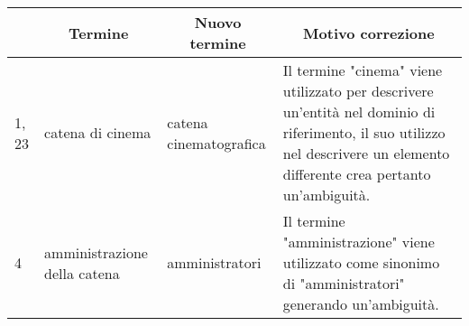 \begin{tabularx}{\linewidth}{|p{1.5cm}|p{3cm}|p{3cm}|X|}
      \hline
      \rowcolor{tblhdrcolor}
      \multicolumn{1}{|c|}{\textbf{Linea}}
       & \multicolumn{1}{|c|}{\textbf{Termine}}
       & \multicolumn{1}{|c|}{\textbf{Nuovo termine}}
       & \multicolumn{1}{|c|}{\textbf{Motivo correzione}}
      \\\hline
      1, 23
       & catena di cinema
       & catena cinematografica
       & Il termine "cinema" viene utilizzato per descrivere un’entità nel
      dominio di riferimento, il suo utilizzo nel descrivere un elemento
      differente crea pertanto un’ambiguità.
      \\ \hline
      4
       & amministrazione della catena
       & amministratori
       & Il termine "amministrazione" viene utilizzato come sinonimo di
      "amministratori" generando un'ambiguità.


\end{tabularx}
